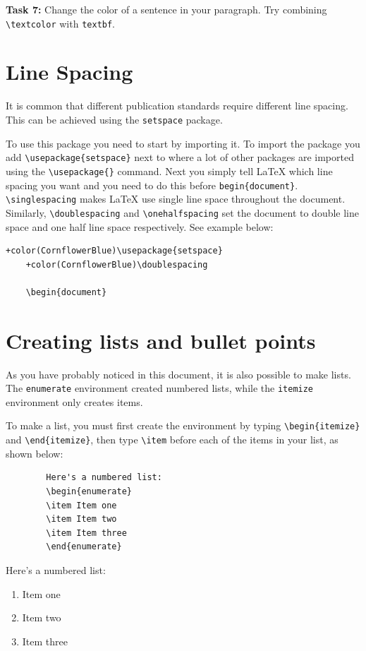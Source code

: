 \documentclass[12pts]{article}
\begin{document}
	\textcolor{BurntOrange}{\textbf{Task 7:}} Change the color of a sentence in your paragraph. Try combining \verb|\textcolor| with \verb|textbf|.
	
	\section{Line Spacing}
	It is common that different publication standards require different line spacing. This can be achieved using the \texttt{setspace} package. 
	
	To use this package you need to start by importing it. To import the package you add \verb|\usepackage{setspace}| next to where a lot of other packages are imported using the  \verb|\usepackage{}| command. Next you simply tell {\LaTeX} which line spacing you want and you need to do this before \verb|begin{document}|. \verb|\singlespacing| makes {\LaTeX} use single line space throughout the document. Similarly, \verb|\doublespacing| and \verb|\onehalfspacing| set the document to double line space and one half line space respectively. See example below:
	
	\begin{Verbatim}[commandchars=+\(\)]
	+color(CornflowerBlue)\usepackage{setspace}
	+color(CornflowerBlue)\doublespacing
	
	\begin{document}
	\end{Verbatim}
	
	\section{Creating lists and bullet points}
	
	As you have probably noticed in this document, it is also possible to make lists. The \texttt{enumerate} environment created numbered lists, while the \texttt{itemize} environment only creates items.
	
	To make a list, you must first create the environment by typing \verb|\begin{itemize}| and \verb|\end{itemize}|, then type \verb|\item| before each of the items in your list, as shown below:
	
	\begin{multicols}{2}
		\begin{Verbatim}
		Here's a numbered list:
		\begin{enumerate}
		\item Item one
		\item Item two
		\item Item three
		\end{enumerate}
		\end{Verbatim}
		
		\columnbreak	
		
		Here's a numbered list:
		\begin{enumerate}
			\item Item one
			\item Item two
			\item Item three
		\end{enumerate}
	\end{multicols}
	
\end{document}
